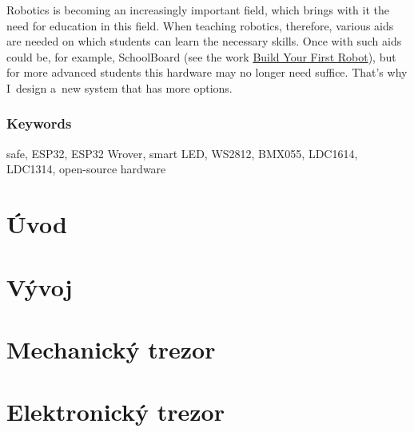 \documentclass{template/socthesis}
\newcommand{\chapterm}[1]{
    
    \chapter{#1}

    \vspace{-10mm}
}
\begin{document}
Robotics is becoming an increasingly important field, which brings with it the need for education in this field.
When teaching robotics, therefore, various aids are needed on which students can learn the necessary skills. Once with such aids
could be, for example, SchoolBoard (see the work \href{https://github.com/TVavrinec/SOC-text/blob/master/SOC.pdf}{Build Your First Robot}), but for more advanced students this hardware may no 
longer need suffice. That's why I~design a~new system that has more options.

\subsection*{Keywords}
\color{black}
safe, ESP32, ESP32 Wrover, smart LED, WS2812, BMX055, LDC1614, \\ LDC1314, open-source hardware

\newpage
\pagestyle{plain}

\tableofcontents

\setcounter{figure}{0}
\setcounter{table}{0}
\newpage

\chapterm{Úvod}


\chapterm{Vývoj}
\label{E-vyvoj}






%
%
%
%

\chapterm{Mechanický trezor} 
\label{M3}


%
%

\newpage

\vspace{-50mm}

\chapterm{Elektronický trezor}
\label{E4}



\newpage

\newpage


\newpage




\end{document}
